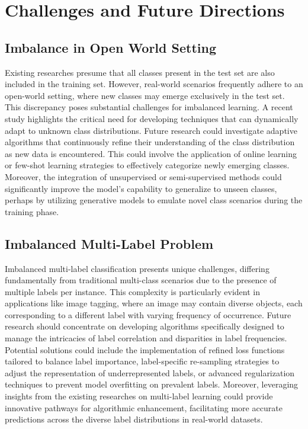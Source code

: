 \section{Challenges and Future Directions}
\label{sec:challenges}

\subsection{Imbalance in Open World Setting}

Existing researches presume that all classes present in the test set are also included in the training set. However, real-world scenarios frequently adhere to an open-world setting, where new classes may emerge exclusively in the test set. This discrepancy poses substantial challenges for imbalanced learning. A recent study \cite{liu2019large} highlights the critical need for developing techniques that can dynamically adapt to unknown class distributions. Future research could investigate adaptive algorithms that continuously refine their understanding of the class distribution as new data is encountered. This could involve the application of online learning or few-shot learning strategies to effectively categorize newly emerging classes. Moreover, the integration of unsupervised or semi-supervised methods could significantly improve the model's capability to generalize to unseen classes, perhaps by utilizing generative models to emulate novel class scenarios during the training phase.

\subsection{Imbalanced Multi-Label Problem}

Imbalanced multi-label classification presents unique challenges, differing fundamentally from traditional multi-class scenarios due to the presence of multiple labels per instance. This complexity is particularly evident in applications like image tagging, where an image may contain diverse objects, each corresponding to a different label with varying frequency of occurrence. Future research should concentrate on developing algorithms specifically designed to manage the intricacies of label correlation and disparities in label frequencies. Potential solutions could include the implementation of refined loss functions tailored to balance label importance, label-specific re-sampling strategies to adjust the representation of underrepresented labels, or advanced regularization techniques to prevent model overfitting on prevalent labels. Moreover, leveraging insights from the existing researches on multi-label learning could provide innovative pathways for algorithmic enhancement, facilitating more accurate predictions across the diverse label distributions in real-world datasets.

